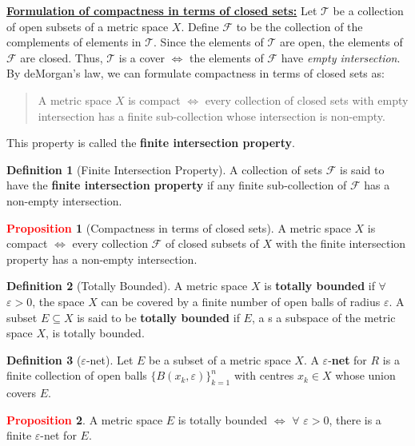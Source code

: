 \documentclass[11pt]{article}
\theoremstyle{definition}
\theoremstyle{definition}
\theoremstyle{definition}
\newtheorem{definition}{\textcolor{OliveGreen}{Definition}}
\newtheorem{prop}{\textcolor{red}{Proposition}}
\theoremstyle{remark}
\begin{document}
\underline{\textbf{Formulation of compactness in terms of closed sets:}} Let $\mathcal{T}$ be a collection of open subsets of a metric space $X$. Define $\mathcal{F}$ to be the collection of the complements of elements in $\mathcal{T}$. Since the elements of $\mathcal{T}$ are open, the elements of $\mathcal{F}$ are closed. Thus, $\mathcal{T}$ is a cover $\iff$ the elements of $\mathcal{F}$ have \emph{empty intersection}. By deMorgan's law, we can formulate compactness in terms of closed sets as: 
\begin{quote}
	A metric space $X$ is compact $\iff$ every collection of closed sets with empty intersection has a finite sub-collection whose intersection is non-empty. 
\end{quote}
	This property is called the \textbf{finite intersection property}.
	
\begin{definition}[Finite Intersection Property]
	A collection of sets $\mathcal{F}$ is said to have the \textbf{finite intersection property} if any finite sub-collection of $\mathcal{F}$ has a non-empty intersection.
\end{definition}

\begin{prop}[Compactness in terms of closed sets]
	A metric space $X$ is compact $\iff$ every collection $\mathcal{F}$ of closed subsets of $X$ with the finite intersection property has a non-empty intersection. 
\end{prop}

\begin{definition}[Totally Bounded]
	A metric space $X$ is \textbf{totally bounded} if $\forall$ $\varepsilon > 0$,  the space $X$ can be covered by a finite number of open balls of radius $\varepsilon$. A subset $E \subseteq X$ is said to be \textbf{totally bounded} if $E$, a s a subspace of the metric space $X$, is totally bounded. 
\end{definition}

\begin{definition}[$\varepsilon$-net] 
	Let $E$ be a subset of a metric space $X$. A $\varepsilon$-\textbf{net} for $R$ is a finite collection of open balls $\{ B(x_k, \varepsilon) \}_{k=1}^n$ with centres $x_k \in X$ whose union covers $E$. 
\end{definition}

\begin{prop}
	A metric space $E$ is totally bounded $\iff$ $\forall$ $\varepsilon > 0$, there is a finite $\varepsilon$-net for $E$. 
\end{prop}
\end{document}

